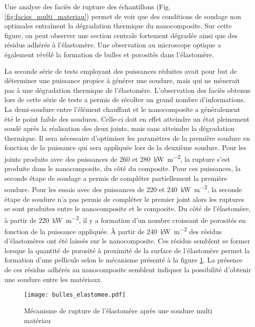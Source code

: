 Une analyse des faciès de rupture des échantillons (Fig. \ref{fig:facies_multi_materiau}) permet de voir que des conditions de soudage non optimales entraînent la dégradation thermique du nanocomposite. 
Sur cette figure, on peut observer une section centrale fortement dégradée ainsi que des résidus adhérés à l'élastomère. 
Une observation au microscope optique a également révélé la formation de bulles et porosités dans l'élastomère. 

La seconde série de tests employant des puissances réduites avait pour but de déterminer une puissance propice à générer une soudure, mais qui ne mènerait pas à une dégradation thermique de l'élastomère. 
L'observation des faciès obtenus lors de cette série de tests a permis de récolter un grand nombre d'informations. 
La demi-soudure entre l'élément chauffant et le nanocomposite a généralement été le point faible des soudures. 
Celle-ci doit en effet atteindre un état pleinement soudé après la réalisation des deux joints, mais sans atteindre la dégradation thermique. 
Il sera nécessaire d'optimiser les paramètres de la première soudure en fonction de la puissance qui sera appliquée lors de la deuxième soudure. 
Pour les joints produits avec des puissances de 260 et \SI{280}{\kilo\watt\per\square\metre}, la rupture s'est produite dans le nanocomposite, du côté du composite. 
Pour ces puissances, la seconde étape de soudage a permis de compléter partiellement la première soudure. 
Pour les essais avec des puissances de 220 et \SI{240}{\kilo\watt\per\square\metre}, la seconde étape de soudure n'a pas permis de compléter le premier joint alors les ruptures se sont produites entre le nanocomposite et le composite. 
Du côté de l'élastomère, à partir de \SI{220}{\kilo\watt\per\square\metre}, il y a formation d'un nombre croissant de porosités en fonction de la puissance appliquée. 
À partir de \SI{240}{\kilo\watt\per\square\metre} des résidus d'élastomères ont été laissés sur le nanocomposite. 
Ces résidus semblent se former lorsque la quantité de porosité à proximité de la surface de l'élastomère permet la formation d'une pellicule selon le mécanisme présenté à la figure \ref{fig:bulles_elastomere}. 
La présence de ces résidus adhérés au nanocomposite semblent indiquer la possibilité d'obtenir une soudure entre les matériaux. 

\begin{figure}[h]
	\centering
	\texttt{[image: bulles\_elastomee.pdf]}
	\caption{Mécanisme de rupture de l'élastomère après une soudure multi matériau}
	\label{fig:bulles_elastomere}
\end{figure}

